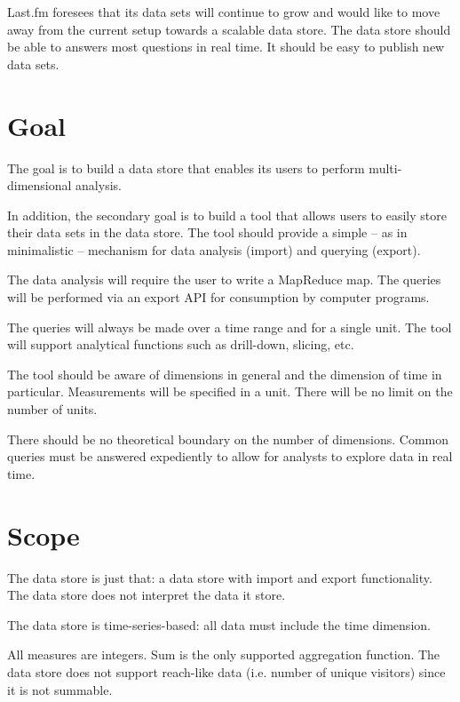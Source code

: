 Last.fm foresees that its data sets will continue to grow and would like to
move away from the current setup towards a scalable data store. The data store
should be able to answers most questions in real time. It should be easy
to publish new data sets.


\section{Goal}


The goal is to build a data store that enables its users to perform
multi-dimensional analysis.

In addition, the secondary goal is to build a tool that allows users to easily
store their data sets in the data store. The tool should provide a simple – as
in minimalistic – mechanism for data analysis (import) and querying (export).

The data analysis will require the user to write a MapReduce map. The queries
will be performed via an export API for consumption by computer programs.

The queries will always be made over a time range and for a single unit. The
tool will support analytical functions such as drill-down, slicing, etc.

The tool should be aware of dimensions in general and the dimension of time in
particular. Measurements will be specified in a unit. There will be no limit
on the number of units.

There should be no theoretical boundary on the number of dimensions. Common
queries must be answered expediently to allow for analysts to explore data in
real time.



\section{Scope}


The data store is just that: a data store with import and export
functionality. The data store does not interpret the data it store.

The data store is time-series-based: all data must include the time dimension.

All measures are integers. Sum is the only supported aggregation function. The
data store does not support reach-like data (i.e. number of unique visitors)
since it is not summable.

